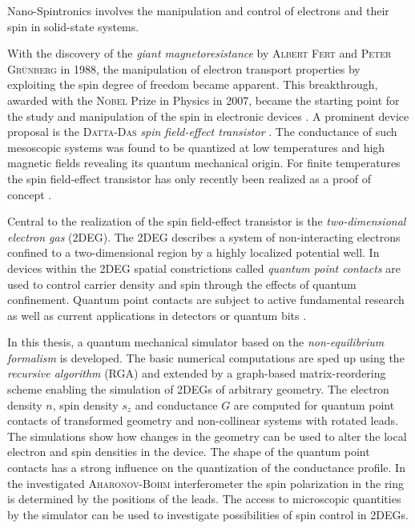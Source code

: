 Nano-Spintronics involves the manipulation and control of electrons and their spin in solid-state systems.\par
With the discovery of the \emph{giant magnetoresistance} by \textsc{Albert Fert} and \textsc{Peter Gr\"unberg} in 1988, the manipulation of electron transport properties by exploiting the spin degree of freedom became apparent. This breakthrough, awarded with the \textsc{Nobel} Prize in Physics in 2007, became the starting point for the study and manipulation of the spin in electronic devices \cite{evegeny2010spin}. A prominent device proposal is the \textsc{Datta-Das} \emph{spin field-effect transistor} \cite{datta:665}. The conductance of such mesoscopic systems was found to be quantized \cite{PhysRevLett.45.494} at low temperatures and high magnetic fields revealing its quantum mechanical origin. For finite temperatures the spin field-effect transistor has only recently been realized as a proof of concept \cite{Wunderlich24122010}.\par
Central to the realization of the spin field-effect transistor is the \emph{two-dimensional electron gas} (2DEG). The 2DEG describes a system of non-interacting electrons confined to a two-dimensional region by a highly localized potential well. In devices within the 2DEG spatial constrictions called \emph{quantum point contacts} are used to control carrier density and spin through the effects of quantum confinement. Quantum point contacts are subject to active fundamental research as well as current applications in detectors \cite{PhysRevB.67.161308} or quantum bits \cite{PhysRevA.57.120}.\par
In this thesis, a quantum mechanical simulator based on the \emph{non-equilibrium \gfnc{} formalism} is developed. The basic numerical computations are sped up using the \emph{recursive \gfnc{} algorithm} (RGA) and extended by a graph-based matrix-reordering scheme enabling the simulation of 2DEGs of arbitrary geometry.
The electron density $n$, spin density $s_z$ and conductance $G$ are computed for quantum point contacts of transformed geometry and non-collinear systems with rotated leads. The simulations show how changes in the geometry can be used to alter the local electron and spin densities in the device.
The shape of the quantum point contacts has a strong influence on the quantization of the conductance profile. In the investigated \textsc{Aharonov-Bohm} interferometer the spin polarization in the ring is determined by the positions of the leads. The access to microscopic quantities by the simulator can be used to investigate possibilities of spin control in 2DEGs.
